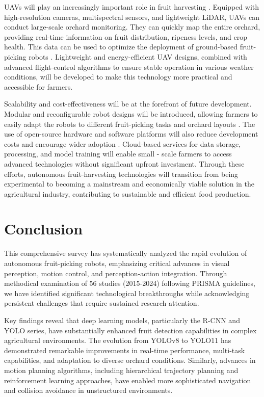 \documentclass{ieeeaccess}
\begin{document}
UAVs will play an increasingly important role in fruit harvesting \cite{mohamed2021smart, martos2021ensuring}. Equipped with high-resolution cameras, multispectral sensors, and lightweight LiDAR, UAVs can conduct large-scale orchard monitoring. They can quickly map the entire orchard, providing real-time information on fruit distribution, ripeness levels, and crop health. This data can be used to optimize the deployment of ground-based fruit-picking robots \cite{martos2021ensuring}. Lightweight and energy-efficient UAV designs, combined with advanced flight-control algorithms to ensure stable operation in various weather conditions, will be developed to make this technology more practical and accessible for farmers.

Scalability and cost-effectiveness will be at the forefront of future development. Modular and reconfigurable robot designs will be introduced, allowing farmers to easily adapt the robots to different fruit-picking tasks and orchard layouts \cite{lytridis2021overview, li2023multi}. The use of open-source hardware and software platforms will also reduce development costs and encourage wider adoption \cite{zhang2024automatic}. Cloud-based services for data storage, processing, and model training will enable small - scale farmers to access advanced technologies without significant upfront investment. Through these efforts, autonomous fruit-harvesting technologies will transition from being experimental to becoming a mainstream and economically viable solution in the agricultural industry, contributing to sustainable and efficient food production.



\section{Conclusion}
This comprehensive survey has systematically analyzed the rapid evolution of autonomous fruit-picking robots, emphasizing critical advances in visual perception, motion control, and perception-action integration. Through methodical examination of 56 studies (2015-2024) following PRISMA guidelines, we have identified significant technological breakthroughs while acknowledging persistent challenges that require sustained research attention.

Key findings reveal that deep learning models, particularly the R-CNN and YOLO series, have substantially enhanced fruit detection capabilities in complex agricultural environments. The evolution from YOLOv8 to YOLO11 has demonstrated remarkable improvements in real-time performance, multi-task capabilities, and adaptation to diverse orchard conditions. Similarly, advances in motion planning algorithms, including hierarchical trajectory planning and reinforcement learning approaches, have enabled more sophisticated navigation and collision avoidance in unstructured environments.
\end{document}
